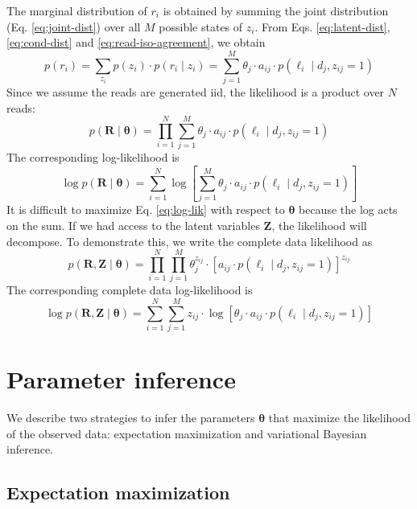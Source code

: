 The marginal distribution of $r_i$ is obtained by summing the joint distribution (Eq. \ref{eq:joint-dist}) over all $M$ possible states of $z_i$. From Eqs. \ref{eq:latent-dist}, \ref{eq:cond-dist} and \ref{eq:read-iso-agreement}, we obtain
\begin{equation}
    p(r_i)=\sum_{z_i}p(z_i)\cdot p(r_i\mid z_i)=\sum_{j=1}^M \theta_j\cdot a_{ij}\cdot p(\ell_i\mid d_j, z_{ij}=1)
\end{equation}
Since we assume the reads are generated iid, the likelihood is a product over $N$ reads:
\begin{equation}
    p(\bm{R}\mid\bm{\theta}) = \prod_{i=1}^N \sum_{j=1}^M \theta_j\cdot a_{ij}\cdot p(\ell_i\mid d_j, z_{ij}=1)\label{eq:lik}
\end{equation}
The corresponding log-likelihood is 
\begin{equation}
    \log p(\bm{R}\mid\bm{\theta}) = \sum_{i=1}^N \log \left[\sum_{j=1}^M \theta_j\cdot a_{ij}\cdot p(\ell_i\mid d_j, z_{ij}=1)\right]\label{eq:log-lik}
\end{equation}
It is difficult to maximize Eq. \ref{eq:log-lik} with respect to $\bm{\theta}$ because the log acts on the sum. If we had access to the latent variables $\bm{Z}$, the likelihood will decompose. To demonstrate this, we write the complete data likelihood as
\begin{equation}
    p(\bm{R},\bm{Z}\mid\bm{\theta})=\prod_{i=1}^N\prod_{j=1}^M \theta_j^{z_{ij}}\cdot\left[a_{ij}\cdot p(\ell_i\mid d_j, z_{ij}=1)\right]^{z_{ij}}\label{eq:comp-lik}
\end{equation}
The corresponding complete data log-likelihood is 
\begin{equation}
    \log p(\bm{R},\bm{Z}\mid\bm{\theta})=\sum_{i=1}^N\sum_{j=1}^M z_{ij}\cdot\log \left[\theta_j\cdot a_{ij}\cdot p(\ell_i\mid d_j, z_{ij}=1)\right]\label{eq:comp-log-lik}
\end{equation}

\section{Parameter inference}

We describe two strategies to infer the parameters $\bm{\theta}$ that maximize the likelihood of the observed data: expectation maximization and variational Bayesian inference.  

\subsection{Expectation maximization}\label{sec:em}


